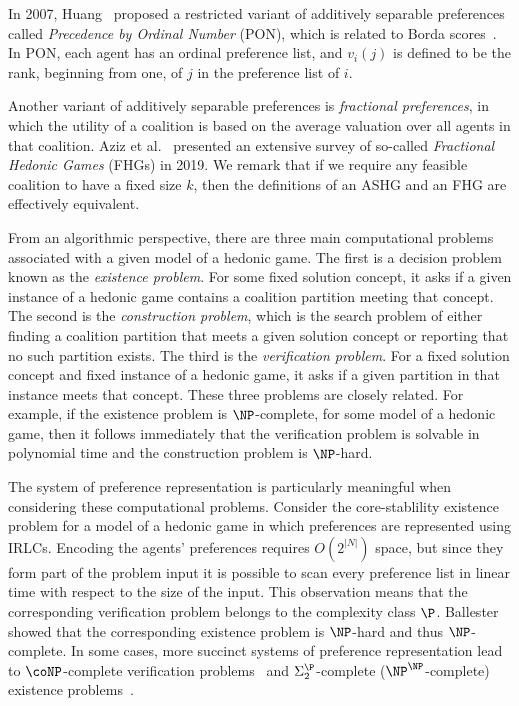 In 2007, Huang~\cite{Huang07conference} proposed a restricted variant of additively separable preferences called \emph{Precedence by Ordinal Number} (PON), which is related to Borda scores~\cite{HedonicGamesHOCSC}. In PON, each agent has an ordinal preference list, and $v_i(j)$ is defined to be the rank, beginning from one, of $j$ in the preference list of $i$.

Another variant of additively separable preferences is \emph{fractional preferences}, in which the utility of a coalition is based on the average valuation over all agents in that coalition. Aziz et al.~\cite{ABBHOP19} presented an extensive survey of so-called \emph{Fractional Hedonic Games} (FHGs) in 2019. We remark that if we require any feasible coalition to have a fixed size $k$, then the definitions of an ASHG and an FHG are effectively equivalent.

From an algorithmic perspective, there are three main computational problems associated with a given model of a hedonic game. The first is a decision problem known as the \emph{existence problem}. For some fixed solution concept, it asks if a given instance of a hedonic game contains a coalition partition meeting that concept. The second is the \emph{construction problem}, which is the search problem of either finding a coalition partition that meets a given solution concept or reporting that no such partition exists. The third is the \emph{verification problem}. For a fixed solution concept and fixed instance of a hedonic game, it asks if a given partition in that instance meets that concept. These three problems are closely related. For example, if the existence problem is $\NP$-complete, for some model of a hedonic game, then it follows immediately that the verification problem is solvable in polynomial time and the construction problem is $\NP$-hard.

The system of preference representation is particularly meaningful when considering these computational problems. Consider the core-stablility existence problem for a model of a hedonic game in which preferences are represented using IRLCs. Encoding the agents' preferences requires $O(2^{|N|})$ space, but since they form part of the problem input it is possible to scan every preference list in linear time with respect to the size of the input. This observation means that the corresponding verification problem belongs to the complexity class $\P$. Ballester~\cite{Bal04} showed that the corresponding existence problem is $\NP$-hard and thus $\NP$-complete. In some cases, more succinct systems of preference representation lead to $\coNP$-complete verification problems~\cite{CSEH2019} and $\Sigma_2^\P$-complete ($\NP^\NP$-complete) existence problems~\cite{WOEGINGER2013101,OBISY17}.

